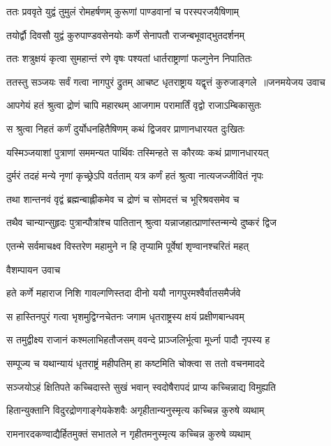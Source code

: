 \twolineshloka
{ततः प्रववृते युद्वं तुमुलं रोमहर्षणम्}
{कुरूणां पाण्डवानां च परस्परजयैषिणाम्}


\twolineshloka
{तयोर्द्वौ दिवसौ युद्वं कुरुपाण्डवसेनयोः}
{कर्णे सेनापतौ राजन्बभूवाद्भुतदर्शनम्}


\twolineshloka
{ततः शत्रुक्षयं कृत्वा सुमहान्तं रणे वृषः}
{पश्यतां धार्तराष्ट्राणां फल्गुनेन निपातितः}


\threelineshloka
{ततस्तु सञ्जयः सर्वं गत्वा नागपुरं द्रुतम्}
{आचष्ट धृतराष्ट्राय यद्वृत्तं कुरुजाङ्गले ॥जनमयेजय उवाच}
{}


\twolineshloka
{आपगेयं हतं श्रुत्वा द्रोणं चापि महारथम्}
{आजगाम परामार्तिं वृद्वो राजाऽम्बिकासुतः}


\twolineshloka
{स श्रुत्वा निहतं कर्णं दुर्योधनहितैषिणम्}
{कथं द्विजवर प्राणानधारयत दुःखितः}


\twolineshloka
{यस्मिञ्जयाशां पुत्राणां सममन्यत पार्थिवः}
{तस्मिन्हते स कौरव्यः कथं प्राणानधारयत्}


\twolineshloka
{दुर्मरं तदहं मन्ये नृणां कृच्छ्रेऽपि वर्तताम्}
{यत्र कर्णं हतं श्रुत्वा नात्यजज्जीवितं नृपः}


\twolineshloka
{तथा शान्तनवं वृद्वं ब्रह्मन्बाह्लीकमेव च}
{द्रोणं च सोमदत्तं च भूरिश्रवसमेव च}


\twolineshloka
{तथैव चान्यान्सुहृदः पुत्रान्पौत्रांश्च पातितान्}
{श्रुत्वा यन्नाजहात्प्राणांस्तन्मन्ये दुष्करं द्विज}


\twolineshloka
{एतन्मे सर्वमाचक्ष्व विस्तरेण महामुने}
{न हि तृप्यामि पूर्वेषां शृण्वानश्चरितं महत्}


\twolineshloka
{वैशम्पायन उवाच}
{}


\twolineshloka
{हते कर्णे महाराज निशि गावल्गणिस्तदा}
{दीनो ययौ नागपुरमश्वैर्वातसमैर्जवे}


\twolineshloka
{स हास्तिनपुरं गत्वा भृशमुद्विग्नचेतनः}
{जगाम धृतराष्ट्रस्य क्षयं प्रक्षीणबान्धवम्}


\twolineshloka
{स तमुद्वीक्ष्य राजानं कश्मलाभिहतौजसम्}
{ववन्दे प्राञ्जलिर्भूत्वा मूर्ध्ना पादौ नृपस्य ह}


\twolineshloka
{सम्पूज्य च यथान्यायं धृतराष्ट्रं महीपतिम्}
{हा कष्टमिति चोक्त्वा स ततो वचनमाददे}


\twolineshloka
{सञ्जयोऽहं क्षितिपते कच्चिदास्ते सुखं भवान्}
{स्वदोषैरापदं प्राप्य कच्चिन्नाद्य विमुह्यति}


\twolineshloka
{हितान्युक्तानि विदुरद्रोणगाङ्गेयकेशवैः}
{अगृहीतान्यनुस्मृत्य कच्चिन्न कुरुषे व्यथाम्}


\twolineshloka
{रामनारदकण्वाद्यैर्हितमुक्तं सभातले}
{न गृहीतमनुस्मृत्य कच्चिन्न कुरुषे व्यथाम्}



